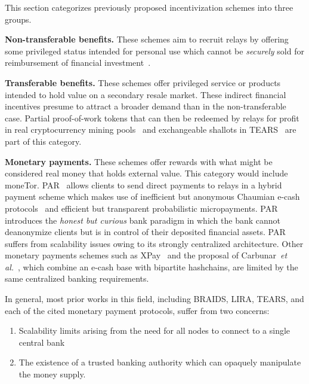 This section categorizes previously proposed incentivization schemes into three groups.

\medskip\noindent\textbf{Non-transferable benefits.} These schemes aim to recruit relays by offering some privileged status intended for personal use which cannot be \emph{securely} sold for reimbursement of financial investment~\cite{dingledine2010building,jansen2010recruiting, jansen2013lira}.

\medskip\noindent\textbf{Transferable benefits.} These schemes offer privileged service or products intended to hold value on a secondary resale market.
These indirect financial incentives presume to attract a broader demand than in the non-transferable case.
Partial proof-of-work tokens that can then be redeemed by relays for profit in real cryptocurrency mining pools~\cite{biryukov2015proof} and exchangeable shallots in TEARS~\cite{jansen2014onions} are part of this category.

\medskip\noindent\textbf{Monetary payments.} These schemes offer rewards with what might be considered real money that holds external value.
This category would include moneTor.
PAR~\cite{androulaki2008payment} allows clients to send direct payments to relays in a hybrid payment scheme which makes use of inefficient but anonymous Chaumian e-cash protocols~\cite{chaum1988untraceable} and efficient but transparent probabilistic micropayments.
PAR introduces the \emph{honest but curious} bank paradigm in which the bank cannot deanonymize clients but is in control of their deposited financial assets.
PAR suffers from scalability issues owing to its strongly centralized architecture.
Other monetary payments schemes such as XPay~\cite{chen2009xpay} and the proposal of Carbunar~\textit{et al.}~\cite{carbunar2012tipping}, which combine an e-cash base with bipartite hashchains, are limited by the same centralized banking requirements.

In general, most prior works in this field, including BRAIDS, LIRA, TEARS, and each of the cited monetary payment protocols, suffer from two concerns:

\begin{enumerate}
\item Scalability limits arising from the need for all nodes to connect to a single central bank
\item The existence of a trusted banking authority which can opaquely manipulate the money supply.
\end{enumerate}

